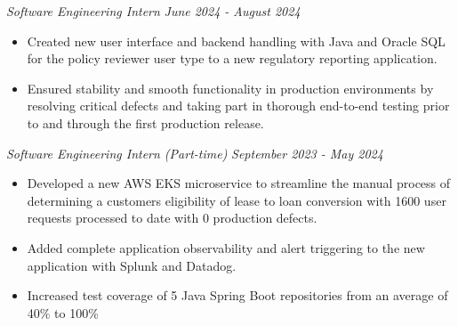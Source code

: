 \documentclass[letterpaper]{article}
\begin{document}
    \textit{Software Engineering Intern} \hfill \textsl{June 2024 - August 2024}\\
    \vspace{-7pt}
    \begin{itemize} \itemsep -1mm

            \item Created new user interface and backend handling with Java and Oracle SQL for the policy reviewer user type to a new regulatory reporting application.
        
            \item Ensured stability and smooth functionality in production environments by resolving critical defects and taking part in thorough end-to-end testing prior to and through the first production release.
        
    \end{itemize}
    \vspace{-2mm}

    
    \textit{Software Engineering Intern (Part-time)} \hfill \textsl{September 2023 - May 2024}\\
    \vspace{-7pt}
    \begin{itemize} \itemsep -1mm
        

            \item Developed a new AWS EKS microservice to streamline the manual process of determining a customers eligibility of lease to loan conversion with 1600 user requests processed to date with 0 production defects.

            \item Added complete application observability and alert triggering to the new application with Splunk and Datadog.

            \item Increased test coverage of 5 Java Spring Boot repositories from an average of 40\% to 100\%
        
    \end{itemize}
    \vspace{-2mm}
\end{document}
